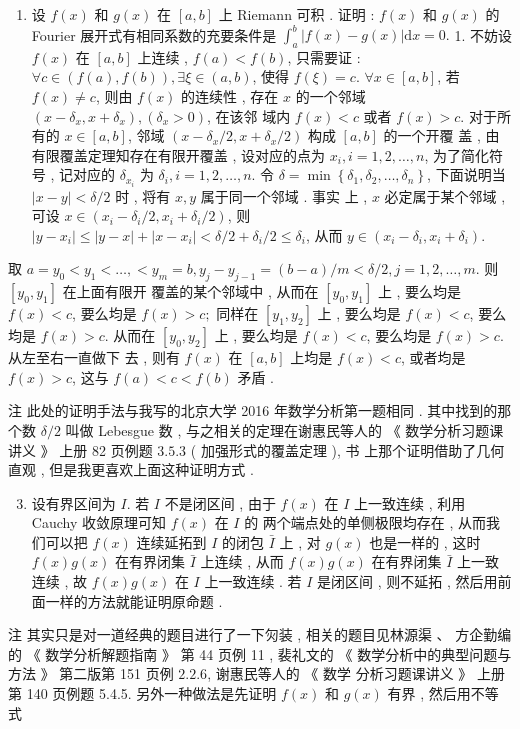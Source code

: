 \documentclass[10pt]{article}
\begin{document}
\begin{enumerate}
  \item  设  $f(x)$  和  $g(x)$  在  $[a, b]$  上  Riemann  可积 .  证明 : $f(x)$  和  $g(x)$  的  Fourier  展开式有相同系数的充要条件是  $\int_{a}^{b}|f(x)-g(x)| \mathrm{d} x=0 .$ 1.  不妨设  $f(x)$  在  $[a, b]$  上连续 , $f(a)<f(b)$,  只需要证 : $\forall c \in(f(a), f(b)), \exists \xi \in(a, b)$,  使得  $f(\xi)=c$. $\forall x \in[a, b]$,  若  $f(x) \neq c$,  则由  $f(x)$  的连续性 ,  存在  $x$  的一个邻域  $\left(x-\delta_{x}, x+\delta_{x}\right),\left(\delta_{x}>0\right)$,  在该邻   域内  $f(x)<c$  或者  $f(x)>c$.  对于所有的  $x \in[a, b]$,  邻域  $\left(x-\delta_{x} / 2, x+\delta_{x} / 2\right)$  构成  $[a, b]$  的一个开覆   盖 ,  由有限覆盖定理知存在有限开覆盖 ,  设对应的点为  $x_{i}, i=1,2, \ldots, n$,  为了简化符号 ,  记对应的  $\delta_{x_{i}}$  为  $\delta_{i}, i=1,2, \ldots, n$.  令  $\delta=\min \left\{\delta_{1}, \delta_{2}, \ldots, \delta_{n}\right\}$,  下面说明当  $|x-y|<\delta / 2$  时 ,  将有  $x, y$  属于同一个邻域 .  事实   上 , $x$  必定属于某个邻域 ,  可设  $x \in\left(x_{i}-\delta_{i} / 2, x_{i}+\delta_{i} / 2\right)$,  则  $\left|y-x_{i}\right| \leqslant|y-x|+\left|x-x_{i}\right|<\delta / 2+\delta_{i} / 2 \leqslant \delta_{i}$,  从而  $y \in\left(x_{i}-\delta_{i}, x_{i}+\delta_{i}\right)$.

\end{enumerate}
 取  $a=y_{0}<y_{1}<\ldots,<y_{m}=b, y_{j}-y_{j-1}=(b-a) / m<\delta / 2, j=1,2, \ldots, m$.  则  $\left[y_{0}, y_{1}\right]$  在上面有限开   覆盖的某个邻域中 ,  从而在  $\left[y_{0}, y_{1}\right]$  上 ,  要么均是  $f(x)<c$,  要么均是  $f(x)>c ;$  同样在  $\left[y_{1}, y_{2}\right]$  上 ,  要么均是  $f(x)<c$,  要么均是  $f(x)>c$.  从而在  $\left[y_{0}, y_{2}\right]$  上 ,  要么均是  $f(x)<c$,  要么均是  $f(x)>c$.  从左至右一直做下   去 ,  则有  $f(x)$  在  $[a, b]$  上均是  $f(x)<c$,  或者均是  $f(x)>c$,  这与  $f(a)<c<f(b)$  矛盾 .

 注   此处的证明手法与我写的北京大学  2016  年数学分析第一题相同 .  其中找到的那个数  $\delta / 2$  叫做  Lebesgue  数 ,  与之相关的定理在谢惠民等人的  《 数学分析习题课讲义 》 上册  82  页例题  $3.5 .3$ ( 加强形式的覆盖定理 ),  书   上那个证明借助了几何直观 ,  但是我更喜欢上面这种证明方式 .

\begin{enumerate}
  \setcounter{enumi}{2}
  \item  设有界区间为  $I$.  若  $I$  不是闭区间 ,  由于  $f(x)$  在  $I$  上一致连续 ,  利用  Cauchy  收敛原理可知  $f(x)$  在  $I$  的   两个端点处的单侧极限均存在 ,  从而我们可以把  $f(x)$  连续延拓到  $I$  的闭包  $\bar{I}$  上 ,  对  $g(x)$  也是一样的 ,  这时  $f(x) g(x)$  在有界闭集  $\bar{I}$  上连续 ,  从而  $f(x) g(x)$  在有界闭集  $\bar{I}$  上一致连续 ,  故  $f(x) g(x)$  在  $I$  上一致连续 .  若  $I$  是闭区间 ,  则不延拓 ,  然后用前面一样的方法就能证明原命题 .
\end{enumerate}
 注   其实只是对一道经典的题目进行了一下灳装 ,  相关的题目见林源渠 、 方企勤编的 《 数学分析解题指南 》 第  44  页例  11 ,  裴礼文的  《 数学分析中的典型问题与方法 》 第二版第  151  页例  $2.2 .6$,  谢惠民等人的  《 数学   分析习题课讲义 》 上册第  140  页例题  5.4.5.  另外一种做法是先证明  $f(x)$  和  $g(x)$  有界 ,  然后用不等式 
\end{document}
